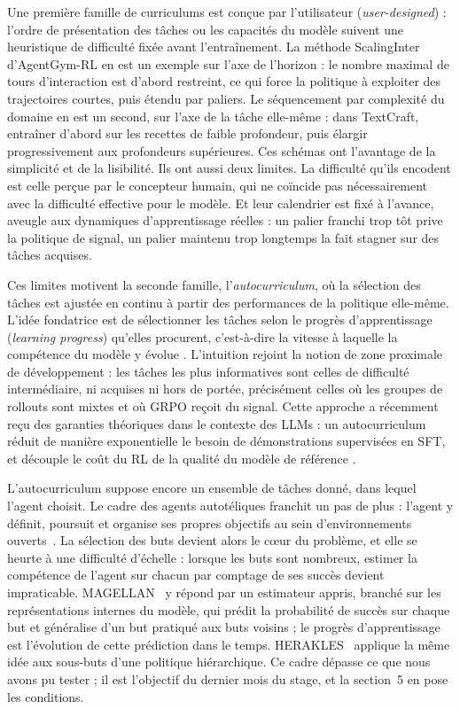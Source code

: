 \documentclass[11pt,a4paper]{article}
\begin{document}
Une première famille de curriculums est conçue par l'utilisateur (\emph{user-designed}) : l'ordre de présentation des tâches ou les capacités du modèle suivent une heuristique de difficulté fixée avant l'entraînement. La méthode ScalingInter d'AgentGym-RL \cite{xi_agentgym-rl_2025} en est un exemple sur l'axe de l'horizon : le nombre maximal de tours d'interaction est d'abord restreint, ce qui force la politique à exploiter des trajectoires courtes, puis étendu par paliers. Le séquencement par complexité du domaine en est un second, sur l'axe de la tâche elle-même : dans TextCraft, entraîner d'abord sur les recettes de faible profondeur, puis élargir progressivement aux profondeurs supérieures. Ces schémas ont l'avantage de la simplicité et de la lisibilité. Ils ont aussi deux limites. La difficulté qu'ils encodent est celle perçue par le concepteur humain, qui ne coïncide pas nécessairement avec la difficulté effective pour le modèle. Et leur calendrier est fixé à l'avance, aveugle aux dynamiques d'apprentissage réelles : un palier franchi trop tôt prive la politique de signal, un palier maintenu trop longtemps la fait stagner sur des tâches acquises.

Ces limites motivent la seconde famille, l'\emph{autocurriculum}, où la sélection des tâches est ajustée en continu à partir des performances de la politique elle-même. L'idée fondatrice est de sélectionner les tâches selon le progrès d'apprentissage (\emph{learning progress}) qu'elles procurent, c'est-à-dire la vitesse à laquelle la compétence du modèle y évolue \cite{graves2017automated}. L'intuition rejoint la notion de zone proximale de développement : les tâches les plus informatives sont celles de difficulté intermédiaire, ni acquises ni hors de portée, précisément celles où les groupes de rollouts sont mixtes et où GRPO reçoit du signal. Cette approche a récemment reçu des garanties théoriques dans le contexte des LLMs : un autocurriculum réduit de manière exponentielle le besoin de démonstrations supervisées en SFT, et découple le coût du RL de la qualité du modèle de référence \cite{rajaraman2026curriculum}.



L'autocurriculum suppose encore un ensemble de tâches donné, dans lequel l'agent choisit. Le cadre des agents autotéliques franchit un pas de plus : l'agent y définit, poursuit et organise ses propres objectifs au sein d'environnements ouverts~\cite{colas2022autotelic}. La sélection des buts devient alors le cœur du problème, et elle se heurte à une difficulté d'échelle : lorsque les buts sont nombreux, estimer la compétence de l'agent sur chacun par comptage de ses succès devient impraticable. MAGELLAN~\cite{gaven2025magellan} y répond par un estimateur appris, branché sur les représentations internes du modèle, qui prédit la probabilité de succès sur chaque but et généralise d'un but pratiqué aux buts voisins ; le progrès d'apprentissage est l'évolution de cette prédiction dans le temps. HERAKLES~\cite{carta2025herakles} applique la même idée aux sous-buts d'une politique hiérarchique. Ce cadre dépasse ce que nous avons pu tester ; il est l'objectif du dernier mois du stage, et la section~5 en pose les conditions.
\end{document}
